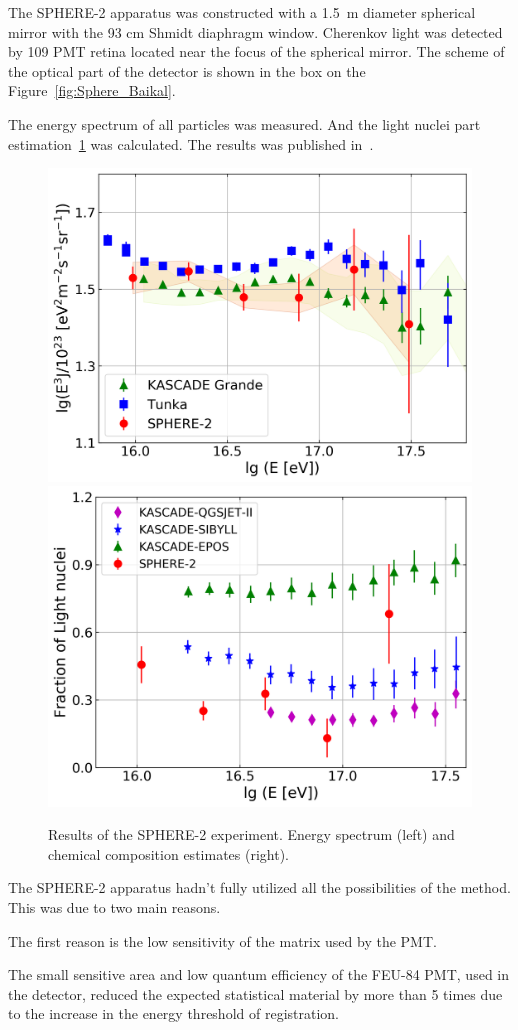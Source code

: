 \documentclass[a4paper,11pt]{article}
\begin{document}
The SPHERE-2 apparatus was constructed with a 1.5~m diameter spherical mirror with the 93 cm Shmidt diaphragm window. Cherenkov light was detected by 109 PMT retina located near the focus of the spherical mirror. The scheme of the optical part of the detector is shown in the box on the Figure~\ref{fig:Sphere_Baikal}.

The energy spectrum of all particles was measured. And the light nuclei part estimation~\ref{fig:Sphere_results} was calculated. The results was published in~\cite{2}. 

\begin{figure}[t]
\centering %
\includegraphics[width=.4\textwidth]{sphere2spectrum.png}
\qquad
\includegraphics[width=.4\textwidth]{sphere2composition.png}
\caption{\label{fig:Sphere_results} Results of the SPHERE-2 experiment. Energy spectrum (left) and chemical composition estimates (right).}
\end{figure}

The SPHERE-2 apparatus hadn't fully utilized all the possibilities of the method. %
This was due to two main reasons.

The first reason is the low sensitivity of the matrix used by the PMT.

The small sensitive area and low quantum efficiency of the FEU-84 PMT, used in the detector, reduced the expected statistical material by more than 5 times due to the increase in the energy threshold of registration.
\end{document}

